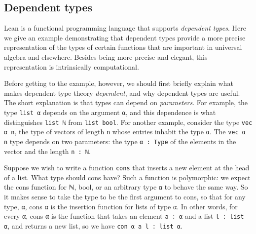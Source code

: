 \documentclass[12pt]{amsart}  %
\begin{document}
\subsection{Dependent types}
Lean is a functional programming language that supports \emph{dependent types}.
Here we give an example demonstrating that dependent types
provide a more precise representation of the types of 
certain functions that are important in universal algebra and elsewhere.
Besides being more precise and elegant, this representation 
is intrinsically computational.

Before getting to the example, however, we should first briefly explain what makes dependent type theory \emph{dependent}, and why dependent types are useful. The short explanation is that types can depend on \emph{parameters}. For example, the type \lstinline{list α} depends on the argument \lstinline{α}, and this dependence is what distinguishes \lstinline{list ℕ} from \lstinline{list bool}. For another example, consider the type \lstinline{vec α n}, the type of vectors of length 
\lstinline{n} whose entries inhabit the type \lstinline{α}. The \lstinline{vec α n} type depends on two parameters: the type \lstinline{α : Type} of the elements in the vector and the length \lstinline{n : ℕ}.

Suppose we wish to write a function \lstinline{cons} that inserts a new element at the head of a list. What type should cons have? Such a function is polymorphic: we expect the cons function for ℕ, bool, or an arbitrary type α to behave the same way. So it makes sense to take the type to be the first argument to cons, so that for any type, α, cons α is the insertion function for lists of type α. In other words, for every α, cons α is the function that takes an element \lstinline{a : α} and a list \lstinline{l : list α}, and returns a new list, so we have \lstinline{con α a l : list α}.
\end{document}
